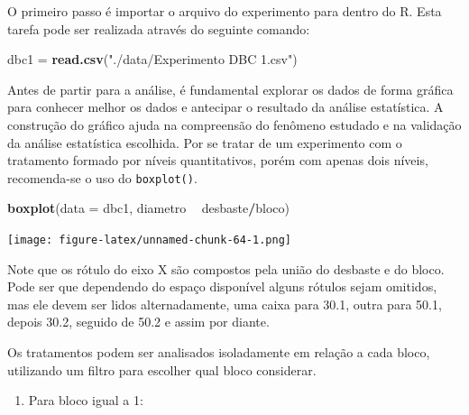 \documentclass[
]{article}
\newenvironment{Shaded}{\begin{snugshade}}{\end{snugshade}}
\newcommand{\DataTypeTok}[1]{\textcolor[rgb]{0.13,0.29,0.53}{#1}}
\newcommand{\DecValTok}[1]{\textcolor[rgb]{0.00,0.00,0.81}{#1}}
\newcommand{\KeywordTok}[1]{\textcolor[rgb]{0.13,0.29,0.53}{\textbf{#1}}}
\newcommand{\NormalTok}[1]{#1}
\newcommand{\OperatorTok}[1]{\textcolor[rgb]{0.81,0.36,0.00}{\textbf{#1}}}
\newcommand{\StringTok}[1]{\textcolor[rgb]{0.31,0.60,0.02}{#1}}
\providecommand{\tightlist}{%
  \setlength{\itemsep}{0pt}\setlength{\parskip}{0pt}}
\begin{document}
O primeiro passo é importar o arquivo do experimento para dentro do R. Esta tarefa pode ser realizada através do seguinte comando:

\begin{Shaded}
\begin{Highlighting}[]
\NormalTok{dbc1 =}\StringTok{ }\KeywordTok{read.csv}\NormalTok{(}\StringTok{"./data/Experimento DBC 1.csv"}\NormalTok{)}
\end{Highlighting}
\end{Shaded}

Antes de partir para a análise, é fundamental explorar os dados de forma gráfica para conhecer melhor os dados e antecipar o resultado da análise estatística. A construção do gráfico ajuda na compreensão do fenômeno estudado e na validação da análise estatística escolhida. Por se tratar de um experimento com o tratamento formado por níveis quantitativos, porém com apenas dois níveis, recomenda-se o uso do \texttt{boxplot()}.

\begin{Shaded}
\begin{Highlighting}[]
\KeywordTok{boxplot}\NormalTok{(}\DataTypeTok{data =}\NormalTok{ dbc1, diametro }\OperatorTok{~}\StringTok{ }\NormalTok{desbaste}\OperatorTok{/}\NormalTok{bloco)}
\end{Highlighting}
\end{Shaded}

\texttt{[image: figure-latex/unnamed-chunk-64-1.png]}

Note que os rótulo do eixo X são compostos pela união do desbaste e do bloco. Pode ser que dependendo do espaço disponível alguns rótulos sejam omitidos, mas ele devem ser lidos alternadamente, uma caixa para 30.1, outra para 50.1, depois 30.2, seguido de 50.2 e assim por diante.

Os tratamentos podem ser analisados isoladamente em relação a cada bloco, utilizando um filtro para escolher qual bloco considerar.

\begin{enumerate}
\def\labelenumi{\arabic{enumi}.}
\tightlist
\item
  Para bloco igual a 1:
\end{enumerate}

\begin{Shaded}
\end{Shaded}
\end{document}
